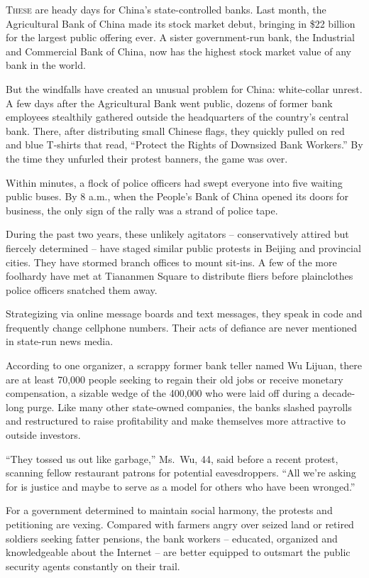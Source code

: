 ﻿\documentclass[12pt]{article}
\begin{document}
\lettrine{T}{hese} are heady days for China's state-controlled banks. Last
month, the Agricultural Bank of China made its stock market debut, bringing in \$22 billion for the
largest public offering ever. A sister government-run bank, the Industrial and Commercial Bank of
China, now has the highest stock market value of any bank in the world.

But the windfalls have created an unusual problem for China: white-collar unrest. A few days after
the Agricultural Bank went public, dozens of former bank employees stealthily gathered outside the
headquarters of the country's central bank. There, after distributing small Chinese flags, they
quickly pulled on red and blue T-shirts that read, ``Protect the Rights of Downsized Bank Workers.''
By the time they unfurled their protest banners, the game was over.

Within minutes, a flock of police officers had swept everyone into five waiting public buses. By 8
a.m., when the People's Bank of China opened its doors for business, the only sign of the rally was
a strand of police tape.

During the past two years, these unlikely agitators -- conservatively attired but fiercely
determined -- have staged similar public protests in Beijing and provincial cities. They have
stormed branch offices to mount sit-ins. A few of the more foolhardy have met at Tiananmen Square to
distribute fliers before plainclothes police officers snatched them away.

Strategizing via online message boards and text messages, they speak in code and frequently change
cellphone numbers. Their acts of defiance are never mentioned in state-run news media.

According to one organizer, a scrappy former bank teller named Wu Lijuan, there are at least 70,000
people seeking to regain their old jobs or receive monetary compensation, a sizable wedge of the
400,000 who were laid off during a decade-long purge. Like many other state-owned companies, the
banks slashed payrolls and restructured to raise profitability and make themselves more attractive
to outside investors.

``They tossed us out like garbage,'' Ms.~Wu, 44, said before a recent protest, scanning fellow
restaurant patrons for potential eavesdroppers. ``All we're asking for is justice and maybe to serve
as a model for others who have been wronged.''

For a government determined to maintain social harmony, the protests and petitioning are vexing.
Compared with farmers angry over seized land or retired soldiers seeking fatter pensions, the bank
workers -- educated, organized and knowledgeable about the Internet -- are better equipped to
outsmart the public security agents constantly on their trail.
\end{document}
